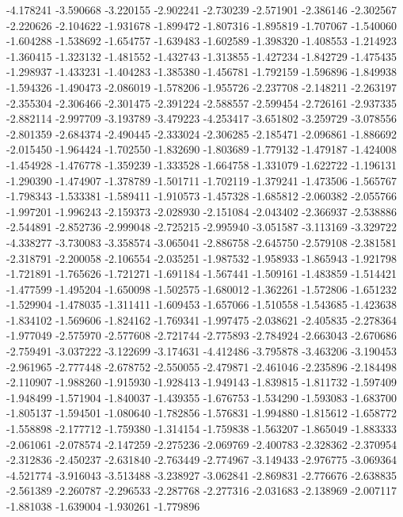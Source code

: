-4.178241
-3.590668
-3.220155
-2.902241
-2.730239
-2.571901
-2.386146
-2.302567
-2.220626
-2.104622
-1.931678
-1.899472
-1.807316
-1.895819
-1.707067
-1.540060
-1.604288
-1.538692
-1.654757
-1.639483
-1.602589
-1.398320
-1.408553
-1.214923
-1.360415
-1.323132
-1.481552
-1.432743
-1.313855
-1.427234
-1.842729
-1.475435
-1.298937
-1.433231
-1.404283
-1.385380
-1.456781
-1.792159
-1.596896
-1.849938
-1.594326
-1.490473
-2.086019
-1.578206
-1.955726
-2.237708
-2.148211
-2.263197
-2.355304
-2.306466
-2.301475
-2.391224
-2.588557
-2.599454
-2.726161
-2.937335
-2.882114
-2.997709
-3.193789
-3.479223
-4.253417
-3.651802
-3.259729
-3.078556
-2.801359
-2.684374
-2.490445
-2.333024
-2.306285
-2.185471
-2.096861
-1.886692
-2.015450
-1.964424
-1.702550
-1.832690
-1.803689
-1.779132
-1.479187
-1.424008
-1.454928
-1.476778
-1.359239
-1.333528
-1.664758
-1.331079
-1.622722
-1.196131
-1.290390
-1.474907
-1.378789
-1.501711
-1.702119
-1.379241
-1.473506
-1.565767
-1.798343
-1.533381
-1.589411
-1.910573
-1.457328
-1.685812
-2.060382
-2.055766
-1.997201
-1.996243
-2.159373
-2.028930
-2.151084
-2.043402
-2.366937
-2.538886
-2.544891
-2.852736
-2.999048
-2.725215
-2.995940
-3.051587
-3.113169
-3.329722
-4.338277
-3.730083
-3.358574
-3.065041
-2.886758
-2.645750
-2.579108
-2.381581
-2.318791
-2.200058
-2.106554
-2.035251
-1.987532
-1.958933
-1.865943
-1.921798
-1.721891
-1.765626
-1.721271
-1.691184
-1.567441
-1.509161
-1.483859
-1.514421
-1.477599
-1.495204
-1.650098
-1.502575
-1.680012
-1.362261
-1.572806
-1.651232
-1.529904
-1.478035
-1.311411
-1.609453
-1.657066
-1.510558
-1.543685
-1.423638
-1.834102
-1.569606
-1.824162
-1.769341
-1.997475
-2.038621
-2.405835
-2.278364
-1.977049
-2.575970
-2.577608
-2.721744
-2.775893
-2.784924
-2.663043
-2.670686
-2.759491
-3.037222
-3.122699
-3.174631
-4.412486
-3.795878
-3.463206
-3.190453
-2.961965
-2.777448
-2.678752
-2.550055
-2.479871
-2.461046
-2.235896
-2.184498
-2.110907
-1.988260
-1.915930
-1.928413
-1.949143
-1.839815
-1.811732
-1.597409
-1.948499
-1.571904
-1.840037
-1.439355
-1.676753
-1.534290
-1.593083
-1.683700
-1.805137
-1.594501
-1.080640
-1.782856
-1.576831
-1.994880
-1.815612
-1.658772
-1.558898
-2.177712
-1.759380
-1.314154
-1.759838
-1.563207
-1.865049
-1.883333
-2.061061
-2.078574
-2.147259
-2.275236
-2.069769
-2.400783
-2.328362
-2.370954
-2.312836
-2.450237
-2.631840
-2.763449
-2.774967
-3.149433
-2.976775
-3.069364
-4.521774
-3.916043
-3.513488
-3.238927
-3.062841
-2.869831
-2.776676
-2.638835
-2.561389
-2.260787
-2.296533
-2.287768
-2.277316
-2.031683
-2.138969
-2.007117
-1.881038
-1.639004
-1.930261
-1.779896
